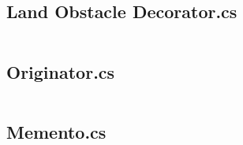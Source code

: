 	\newpage
	
	\subsection{Land Obstacle Decorator.cs}
	\inputminted[linenos=true,fontsize=\footnotesize,tabsize=2]{csharp}{../Battleship/Battleship/Land_Obstacle_Decorator.cs}
	
	\newpage
	
	\subsection{Originator.cs}
	\inputminted[linenos=true,fontsize=\footnotesize,tabsize=2]{csharp}{../Battleship/Battleship/Originator.cs}
	
	\newpage
	
	\subsection{Memento.cs}
	\inputminted[linenos=true,fontsize=\footnotesize,tabsize=2]{csharp}{../Battleship/Battleship/Memento.cs}
	
	
	
	




